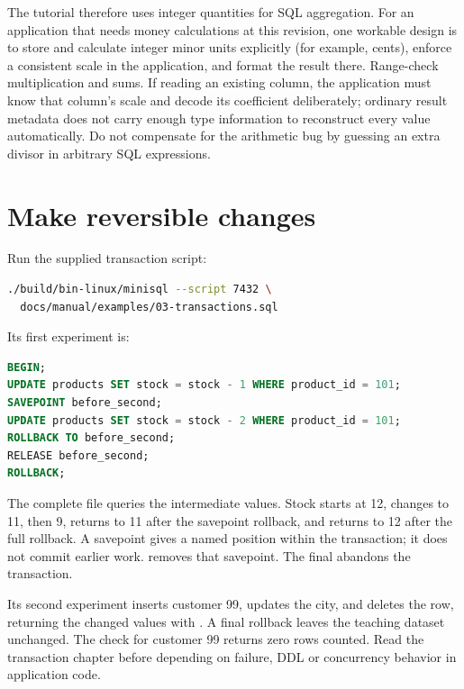The tutorial therefore uses integer quantities for SQL aggregation.
For an application that needs money calculations at this revision, one
workable design is to store and calculate integer minor units explicitly
(for example, cents), enforce a consistent scale in the application, and
format the result there. Range-check multiplication and sums. If reading an
existing  column, the application must know that column's
scale and decode its coefficient deliberately; ordinary result metadata does
not carry enough type information to reconstruct every value automatically.
Do not compensate for the arithmetic bug by guessing an extra divisor in
arbitrary SQL expressions.

\section{Make reversible changes}
Run the supplied transaction script:
\begin{lstlisting}[language=bash]
./build/bin-linux/minisql --script 7432 \
  docs/manual/examples/03-transactions.sql
\end{lstlisting}
Its first experiment is:
\begin{lstlisting}[language=SQL]
BEGIN;
UPDATE products SET stock = stock - 1 WHERE product_id = 101;
SAVEPOINT before_second;
UPDATE products SET stock = stock - 2 WHERE product_id = 101;
ROLLBACK TO before_second;
RELEASE before_second;
ROLLBACK;
\end{lstlisting}
The complete file queries the intermediate values. Stock starts at 12,
changes to 11, then 9, returns to 11 after the savepoint rollback, and returns
to 12 after the full rollback. A savepoint gives a named position within the
transaction; it does not commit earlier work. \code{RELEASE} removes that
savepoint. The final \code{ROLLBACK} abandons the transaction.



Its second experiment inserts customer 99, updates the city, and deletes the
row, returning the changed values with \code{RETURNING}. A final rollback
leaves the teaching dataset unchanged. The check for customer 99 returns
zero rows counted. Read the transaction chapter before depending on failure,
DDL or concurrency behavior in application code.

